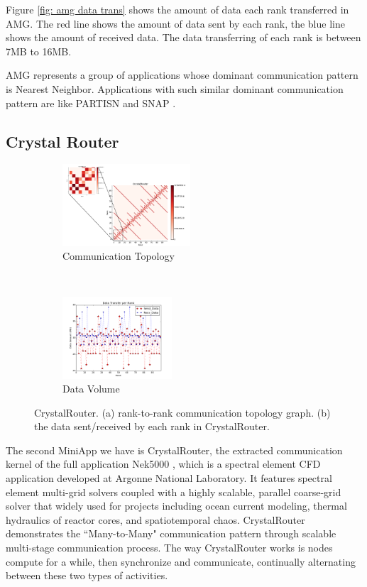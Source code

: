 \documentclass[conference]{IEEEtran}
\begin{document}
Figure \ref{fig: amg data trans} shows the amount of data each rank transferred in AMG. The red line shows the amount of data sent by each rank, the blue line shows the amount of received data. The data transferring of each rank is between 7MB to 16MB.

AMG represents a group of applications whose dominant communication pattern is Nearest Neighbor. Applications with such similar dominant communication pattern are like PARTISN\cite{designforwardwebpage} and SNAP \cite{designforwardwebpage}.


\subsection{Crystal Router}
\label{sec:crystalrouter}

\begin{figure}[t!]
    \centering
    \begin{subfigure}[t]{0.22\textwidth}
        \centering
        \includegraphics[height=1.2in]{figs/appstudy/cr/cr_pip}
        \caption{Communication Topology}
        \label{fig: cr communication topology}
    \end{subfigure}
    ~
    \begin{subfigure}[t]{0.22\textwidth}
        \centering
        \includegraphics[height=1.2in]{figs/appstudy/cr/cr_data_transfer}
        \caption{Data Volume}
        \label{fig: cr data trans}
    \end{subfigure}
    \caption{CrystalRouter. (a) rank-to-rank communication topology graph. (b) the data sent/received by each rank in CrystalRouter. }
\end{figure}

The second MiniApp we have is CrystalRouter, the extracted communication kernel of the full application Nek5000 \cite{crystalrouter}, which is a spectral element CFD application developed at Argonne National Laboratory. It features spectral element multi-grid solvers coupled with a highly scalable, parallel coarse-grid solver that widely used for projects including ocean current modeling, thermal hydraulics of reactor cores, and spatiotemporal chaos. CrystalRouter demonstrates the ``Many-to-Many" communication pattern through scalable multi-stage communication process. The way CrystalRouter works is nodes compute for a while, then synchronize and communicate, continually alternating between these two types of activities.
\end{document}
